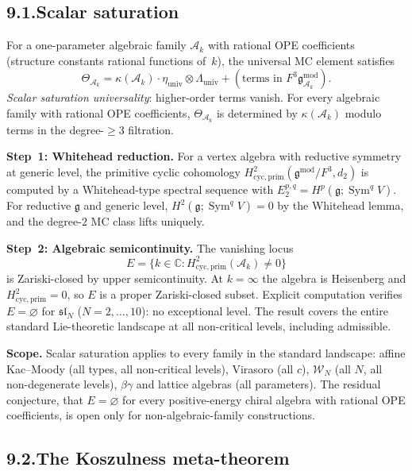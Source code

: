 \documentclass[11pt,reqno]{amsart}
\theoremstyle{definition}
\theoremstyle{remark}
\providecommand{\cA}{\mathcal{A}}
\numberwithin{equation}{section}
\begin{document}
\subsection*{9.1.\enspace Scalar saturation}

For a one-parameter algebraic family $\cA_k$ with rational OPE
coefficients (structure constants rational functions of~$k$), the
universal MC element satisfies
\[
\Theta_{\cA_k}=\kappa(\cA_k)\cdot\eta_{\mathrm{univ}}\otimes\Lambda_{\mathrm{univ}}+(\text{terms in }F^3\mathfrak g^{\mathrm{mod}}_{\cA_k}).
\]
\emph{Scalar saturation universality}: higher-order terms vanish. For
every algebraic family with rational OPE coefficients, $\Theta_{\cA_k}$
is determined by $\kappa(\cA_k)$ modulo terms in the degree-$\ge 3$
filtration.

\medskip
\noindent\textbf{Step~1: Whitehead reduction.}\enspace
For a vertex algebra with reductive symmetry at generic level, the
primitive cyclic cohomology
$H^2_{\mathrm{cyc,prim}}(\mathfrak g^{\mathrm{mod}}/F^3,d_2)$ is
computed by a Whitehead-type spectral sequence with
$E_2^{p,q}=H^p(\mathfrak g;\operatorname{Sym}^q V)$. For reductive
$\mathfrak g$ and generic level, $H^2(\mathfrak g;\operatorname{Sym}^q V)=0$
by the Whitehead lemma, and the degree-$2$ MC class lifts uniquely.

\medskip
\noindent\textbf{Step~2: Algebraic semicontinuity.}\enspace
The vanishing locus
\[
E=\{k\in\mathbb C:H^2_{\mathrm{cyc,prim}}(\cA_k)\neq 0\}
\]
is Zariski-closed by upper semicontinuity. At $k=\infty$ the algebra
is Heisenberg and $H^2_{\mathrm{cyc,prim}}=0$, so $E$ is a proper
Zariski-closed subset. Explicit computation verifies $E=\varnothing$
for $\mathfrak{sl}_N$ ($N=2,\ldots,10$): no exceptional level. The
result covers the entire standard Lie-theoretic landscape at all
non-critical levels, including admissible.

\medskip
\noindent\textbf{Scope.}\enspace
Scalar saturation applies to every family in the standard landscape:
affine Kac--Moody (all types, all non-critical levels), Virasoro (all
$c$), $\mathcal W_N$ (all $N$, all non-degenerate levels),
$\beta\gamma$ and lattice algebras (all parameters). The residual
conjecture, that $E=\varnothing$ for every positive-energy chiral
algebra with rational OPE coefficients, is open only for
non-algebraic-family constructions.

\subsection*{9.2.\enspace The Koszulness meta-theorem}
\end{document}
